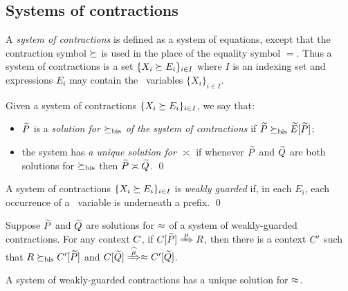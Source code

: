 \subsection{Systems of contractions}
\label{ss:SysContr}

A \emph{system of contractions} is defined as a system of equations,
except that the contraction symbol $\mathrel{\succeq}$ is used in the place of
the equality symbol $=$. Thus a system of contractions is a set 
$\{  X_i \mathrel{\succeq} E_i\}_{i\in I}$
where $I$ is an  indexing set and expressions
$E_i$  may contain the  \behavC\  variables 
$\{  X_i\}_{i\in I}$.

\begin{definition}
\label{d:uniContra}
Given a  system of contractions 
$\{  X_i \mathrel{\succeq} E_i\}_{i\in I}$, 
 we say that:
\begin{itemize}
\item
 $\widetilde P$ is a \emph{solution  for $\mathrel{\succeq_{\rm{bis}}}$ of the 
 system of contractions} 
 if $\widetilde P \mathrel{\succeq_{\rm{bis}}} \widetilde E [\widetilde P]$;
\item 
the system  
has  \emph{a unique 
solution for $\asymp$}
if 
whenever 
 $\widetilde P$ and $\widetilde Q$ are both solutions  for  $\mathrel{\succeq_{\rm{bis}}}$
 then $\widetilde P \asymp \widetilde Q$.
\qed\end{itemize}
\end{definition}
  


\begin{definition}
\label{d:guarded}
A system of contractions $\{  X_i \mathrel{\succeq} E_i\}_{i\in I}$
 is
\emph{weakly guarded}
if,  in each    $E_i$, each occurrence of
a \behavC\ variable is underneath a prefix.
\qed\end{definition}




 
\begin{lemma}
\label{l:uptocon}
Suppose $\widetilde P$ and $\widetilde Q$ are solutions  for $\approx$
 of a system of weakly-guarded
contractions.
For any context $C$, 
if  $\ct{\til P}\Arr{\mu}  R$,
 then 
there is a  context $C'$
such that $R \mathrel{\succeq_{\rm{bis}}} C' [\widetilde P]$ and  $\ct{\til Q} \Arcap{\mu}
 \wb \ctp{\til Q}$.
\end{lemma}
   


\begin{theorem}
\label{t:contraBisimulationU}
A system of weakly-guarded contractions
    has 
a unique solution 
 for $\approx$.
\end{theorem} 

